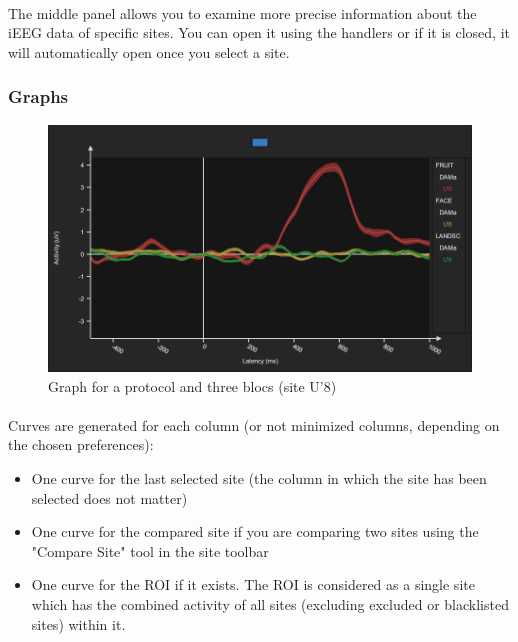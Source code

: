 \documentclass[a4paper]{article}
\begin{document}
\paragraph{} The middle panel allows you to examine more precise information about the iEEG data of specific sites. You can open it using the handlers or if it is closed, it will automatically open once you select a site.
\subsubsection{Graphs}
\begin{figure}[H]
\begin{center}
\includegraphics[scale=0.35]{Graph.png}
\end{center}
\caption{\label{graph}Graph for a protocol and three blocs (site U'8)}
\end{figure}
\paragraph{} Curves are generated for each column (or not minimized columns, depending on the chosen preferences):
\begin{itemize}
\item One curve for the last selected site (the column in which the site has been selected does not matter)
\item One curve for the compared site if you are comparing two sites using the "Compare Site" tool in the site toolbar
\item One curve for the ROI if it exists. The ROI is considered as a single site which has the combined activity of all sites (excluding excluded or blacklisted sites) within it.
\end{itemize}
\end{document}
